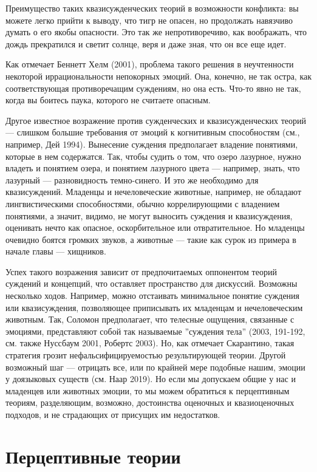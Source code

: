 \documentclass[11pt]{book}
\begin{document}
Преимущество таких квазисужденческих теорий в возможности конфликта: вы можете легко прийти к выводу, что тигр не опасен, но продолжать навязчиво думать о его якобы опасности. Это так же непротиворечиво, как воображать, что дождь прекратился и светит солнце, веря и даже зная, что он все еще идет.

Как отмечает Беннетт Хелм (2001), проблема такого решения в неучтенности некоторой иррациональности непокорных эмоций. Она, конечно, не так остра, как соответствующая противоречащим суждениям, но она есть. Что-то явно не так, когда вы боитесь паука, которого не считаете опасным.

Другое известное возражение против сужденческих и квазисужденческих теорий --- слишком большие требования от эмоций к когнитивным способностям (см., например, Дей 1994). Вынесение суждения предполагает владение понятиями, которые в нем содержатся. Так, чтобы судить о том, что озеро лазурное, нужно владеть и понятием озера, и понятием лазурного цвета --- например, знать, что лазурный --- разновидность темно-синего. И это же необходимо для квазисуждений. Младенцы и нечеловеческие животные, например, не обладают лингвистическими способностями, обычно коррелирующими с владением понятиями, а значит, видимо, не могут выносить суждения и квазисуждения, оценивать нечто как опасное, оскорбительное или отвратительное. Но младенцы очевидно боятся громких звуков, а животные --- такие как сурок из примера в начале главы --- хищников.

Успех такого возражения зависит от предпочитаемых оппонентом теорий суждений и концепций, что оставляет пространство для дискуссий. Возможны несколько ходов. Например, можно отстаивать минимальное понятие суждения или квазисуждения, позволяющее приписывать их младенцам и нечеловеческим животным. Так, Соломон предполагает, что телесные ощущения, связанные с эмоциями, представляют собой так называемые ''суждения тела'' (2003, 191-192, см. также Нуссбаум 2001, Робертс 2003). Но, как отмечает Скарантино, такая стратегия грозит нефальсифицируемостью результирующей теории. Другой возможный шаг --- отрицать все, или по крайней мере подобные нашим, эмоции у доязыковых существ (см. Наар 2019). Но если мы допускаем общие у нас и младенцев или животных эмоции, то мы можем обратиться к перцептивным теориям, разделяющим, возможно, достоинства оценочных и квазиоценочных подходов, и не страдающих от присущих им недостатков.

\section{Перцептивные теории}
\end{document}
